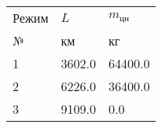 \begin{tabular}{lll}
Режим & $L$ & $m_{цн}$ \\
№ & км & кг \\
1 & 3602.0 & 64400.0 \\
2 & 6226.0 & 36400.0 \\
3 & 9109.0 & 0.0 \\
\end{tabular}

